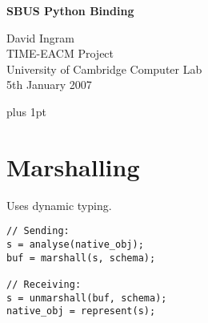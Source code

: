 \documentclass[12pt,a4paper,twoside]{article}
\renewcommand{\_}{\texttt{\symbol{95}}}
\begin{document}
\centerline{\textbf{\LARGE SBUS Python Binding}}
\begin{center} \large
David Ingram\\
TIME-EACM Project\\
University of Cambridge Computer Lab\\
5th January 2007\\
\end{center}

{ \parskip 1mm plus 1pt \tableofcontents }
\pagestyle{fancy}

\section{Marshalling}

Uses dynamic typing.

\begin{verbatim}
// Sending:
s = analyse(native_obj);
buf = marshall(s, schema);

// Receiving:
s = unmarshall(buf, schema);
native_obj = represent(s);
\end{verbatim}
\end{document}

